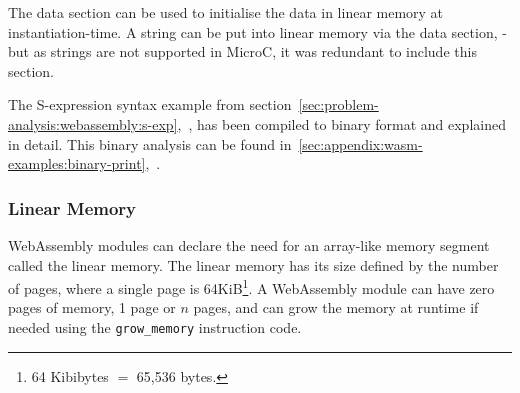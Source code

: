 \documentclass[a4paper]{article}
\begin{document}
The data section can be used to initialise the data in linear memory at instantiation-time. A string can be put into linear memory via the data section, - but as strings are not supported in MicroC, it was redundant to include this section.

The S-expression syntax example from section~\ref{sec:problem-analysis:webassembly:s-exp},~, has been compiled to binary format and explained in detail. This binary analysis can be found in~\ref{sec:appendix:wasm-examples:binary-print},~.

\subsubsection{Linear Memory}
\label{sec:problem-analysis:webassembly:linear-memory}
WebAssembly modules can declare the need for an array-like memory segment called the linear memory. The linear memory has its size defined by the number of pages, where a single page is 64KiB\footnote{64 Kibibytes $=$ 65,536 bytes.}. A WebAssembly module can have zero pages of memory, 1 page or $n$ pages, and can grow the memory at runtime if needed using the \texttt{grow\_memory} instruction code.
\end{document}
